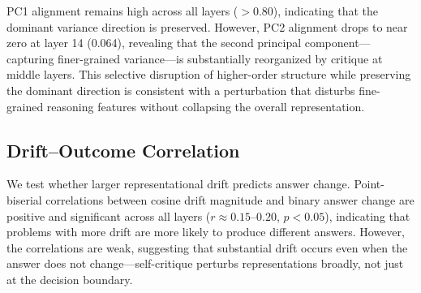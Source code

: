 PC1 alignment remains high across all layers ($> 0.80$), indicating that the dominant variance direction is preserved. However, PC2 alignment drops to near zero at layer 14 (0.064), revealing that the second principal component---capturing finer-grained variance---is substantially reorganized by critique at middle layers. This selective disruption of higher-order structure while preserving the dominant direction is consistent with a perturbation that disturbs fine-grained reasoning features without collapsing the overall representation.

\subsection{Drift--Outcome Correlation}
\label{sec:results:correlation}

We test whether larger representational drift predicts answer change. Point-biserial correlations between cosine drift magnitude and binary answer change are positive and significant across all layers ($r \approx 0.15$--$0.20$, $p < 0.05$), indicating that problems with more drift are more likely to produce different answers. However, the correlations are weak, suggesting that substantial drift occurs even when the answer does not change---self-critique perturbs representations broadly, not just at the decision boundary.
